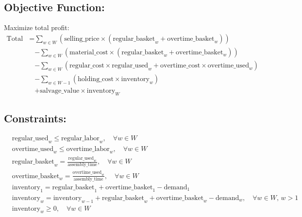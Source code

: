 \documentclass{article}
\begin{document}
\subsection*{Objective Function:}
Maximize total profit:
\begin{align*}
    \text{Total Profit} = &\sum_{w \in W} \left(\text{selling\_price} \times (\text{regular\_basket}_w + \text{overtime\_basket}_w) \right) \\
                          & - \sum_{w \in W} \left(\text{material\_cost} \times (\text{regular\_basket}_w + \text{overtime\_basket}_w) \right) \\
                          & - \sum_{w \in W} \left(\text{regular\_cost} \times \text{regular\_used}_w + \text{overtime\_cost} \times \text{overtime\_used}_w \right) \\
                          & - \sum_{w \in W-1} \left(\text{holding\_cost} \times \text{inventory}_w \right) \\
                          & + \text{salvage\_value} \times \text{inventory}_W
\end{align*}

\subsection*{Constraints:}
\begin{align*}
    & \text{regular\_used}_w \leq \text{regular\_labor}_w, \quad \forall w \in W \\
    & \text{overtime\_used}_w \leq \text{overtime\_labor}_w, \quad \forall w \in W \\
    & \text{regular\_basket}_w = \frac{\text{regular\_used}_w}{\text{assembly\_time}}, \quad \forall w \in W \\
    & \text{overtime\_basket}_w = \frac{\text{overtime\_used}_w}{\text{assembly\_time}}, \quad \forall w \in W \\
    & \text{inventory}_1 = \text{regular\_basket}_1 + \text{overtime\_basket}_1 - \text{demand}_1 \\
    & \text{inventory}_w = \text{inventory}_{w-1} + \text{regular\_basket}_w + \text{overtime\_basket}_w - \text{demand}_w, \quad \forall w \in W, \, w > 1 \\
    & \text{inventory}_w \geq 0, \quad \forall w \in W
\end{align*}
\end{document}
